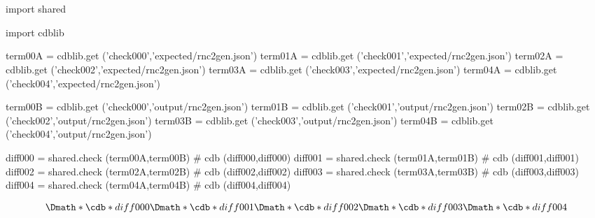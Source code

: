 \documentclass[12pt]{cdblatex}
\begin{document}
\section*{\jobname}


\begin{cadabra}
   import shared

   import cdblib

   term00A = cdblib.get ('check000','expected/rnc2gen.json')
   term01A = cdblib.get ('check001','expected/rnc2gen.json')
   term02A = cdblib.get ('check002','expected/rnc2gen.json')
   term03A = cdblib.get ('check003','expected/rnc2gen.json')
   term04A = cdblib.get ('check004','expected/rnc2gen.json')

   term00B = cdblib.get ('check000','output/rnc2gen.json')
   term01B = cdblib.get ('check001','output/rnc2gen.json')
   term02B = cdblib.get ('check002','output/rnc2gen.json')
   term03B = cdblib.get ('check003','output/rnc2gen.json')
   term04B = cdblib.get ('check004','output/rnc2gen.json')

   diff000 = shared.check (term00A,term00B)   # cdb (diff000,diff000)
   diff001 = shared.check (term01A,term01B)   # cdb (diff001,diff001)
   diff002 = shared.check (term02A,term02B)   # cdb (diff002,diff002)
   diff003 = shared.check (term03A,term03B)   # cdb (diff003,diff003)
   diff004 = shared.check (term04A,term04B)   # cdb (diff004,diff004)

\end{cadabra}

\begin{dgroup*}
   \Dmath*{ \cdb*{diff000} }
   \Dmath*{ \cdb*{diff001} }
   \Dmath*{ \cdb*{diff002} }
   \Dmath*{ \cdb*{diff003} }
   \Dmath*{ \cdb*{diff004} }
\end{dgroup*}
\end{document}
